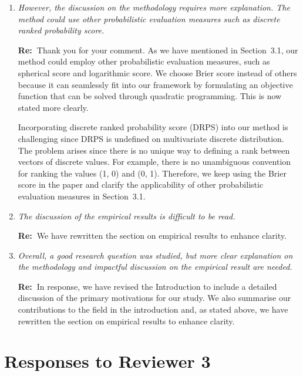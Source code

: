 \documentclass[11pt,a4paper]{article}
\newcommand{\RE}[2][Re:~]{{\color{blue}\textbf{#1}#2}}
\begin{document}
\begin{enumerate}
    \item \textit{However, the discussion on the methodology requires more explanation. The method could use other probabilistic evaluation measures such as discrete ranked probability score.}
   
    \RE{Thank you for your comment. As we have mentioned in Section~3.1, our method could employ other probabilistic evaluation measures, such as spherical score and logarithmic score. We choose Brier score instead of others because it can seamlessly fit into our framework by formulating an objective function that can be solved through quadratic programming. This is now stated more clearly.
    
    Incorporating discrete ranked probability score (DRPS) into our method is challenging since DRPS is undefined on multivariate discrete distribution. The problem arises since there is no unique way to defining a rank between vectors of discrete values. For example, there is no unambiguous convention for ranking the values (1, 0) and (0, 1). Therefore, we keep using the Brier score in the paper and clarify the applicability of other probabilistic evaluation measures in Section~3.1.
    }

    \item \textit{The discussion of the empirical results is difficult to be read.}
    
    \RE{We have rewritten the section on empirical results to enhance clarity.}
    
    \item \textit{Overall, a good research question was studied, but more clear explanation on the methodology and impactful discussion on the empirical result are needed.}
    
    \RE{In response, we have revised the Introduction to include a detailed discussion of the primary motivations for our study. We also summarise our contributions to the field in the introduction and, as stated above, we have rewritten the section on empirical results to enhance clarity.}
    
\end{enumerate}




\newpage
\section*{Responses to Reviewer 3}\label{reviewer-3-comments}
\end{document}
